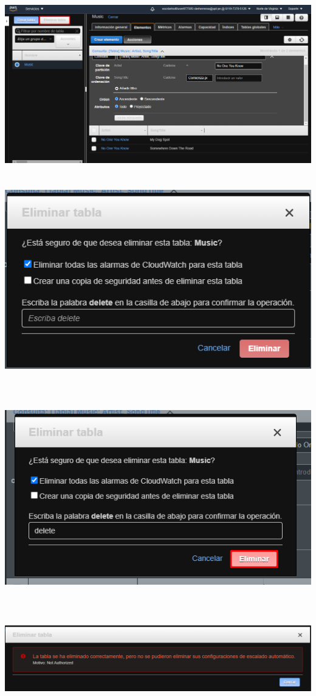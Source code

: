 \documentclass[12pt,letterpaper]{article}
\begin{document}
\begin{center}
    \includegraphics[width=18cm, height=8cm]{img/ELIMINAR.png}  
\end{center}

\begin{center}
    \includegraphics[width=18cm, height=8cm]{img/ELIMINAR2.png}  
\end{center}
\begin{center}
    \includegraphics[width=18cm, height=10cm]{img/eliminar3.png}  
\end{center}
\begin{center}
    \includegraphics[width=18cm, height=3cm]{img/eliminar4.png}  
\end{center}
\end{document}
